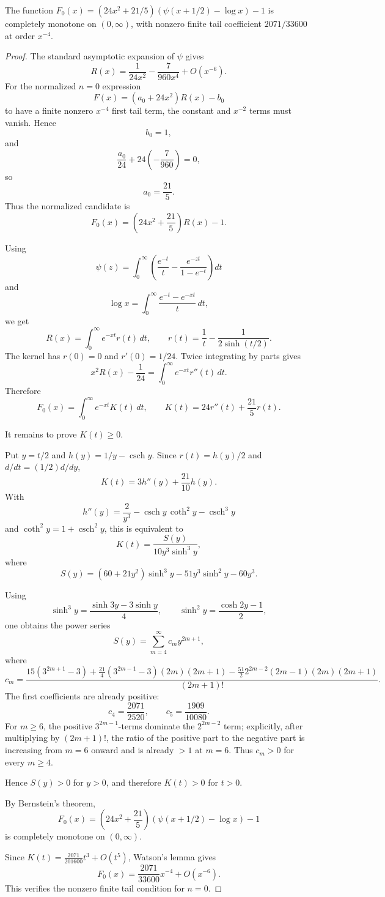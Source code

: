 \begin{proposition}
\label{res:yang-detemple-r-n0-cm-certificate}
The function \(F_0(x)=\left(24x^2+21/5\right)(\psi(x+1/2)-\log x)-1\) is completely monotone on \((0,\infty)\), with nonzero finite tail coefficient \(2071/33600\) at order \(x^{-4}\).
\end{proposition}
\begin{proof}
The standard asymptotic expansion of \(\psi\) gives
\[
R(x)=\frac{1}{24x^2}-\frac{7}{960x^4}+O(x^{-6}).
\]
For the normalized \(n=0\) expression
\[
F(x)=(a_0+24x^2)R(x)-b_0
\]
to have a finite nonzero \(x^{-4}\) first tail term, the constant and \(x^{-2}\) terms must vanish.  Hence
\[
b_0=1,
\]
and
\[
\frac{a_0}{24}+24\left(-\frac{7}{960}\right)=0,
\]
so
\[
a_0=\frac{21}{5}.
\]
Thus the normalized candidate is
\[
F_0(x)=\left(24x^2+\frac{21}{5}\right)R(x)-1.
\]

Using
\[
\psi(z)=\int_0^\infty\left(\frac{e^{-t}}{t}-\frac{e^{-zt}}{1-e^{-t}}\right)dt
\]
and
\[
\log x=\int_0^\infty\frac{e^{-t}-e^{-xt}}{t}\,dt,
\]
we get
\[
R(x)=\int_0^\infty e^{-xt}r(t)\,dt,
\qquad
r(t)=\frac1t-\frac{1}{2\sinh(t/2)}.
\]
The kernel has \(r(0)=0\) and \(r'(0)=1/24\).  Twice integrating by parts gives
\[
x^2R(x)-\frac1{24}=\int_0^\infty e^{-xt}r''(t)\,dt.
\]
Therefore
\[
F_0(x)=\int_0^\infty e^{-xt}K(t)\,dt,
\qquad
K(t)=24r''(t)+\frac{21}{5}r(t).
\]

It remains to prove \(K(t)\ge0\).

Put \(y=t/2\) and \(h(y)=1/y-\operatorname{csch}y\).  Since \(r(t)=h(y)/2\) and \(d/dt=(1/2)d/dy\),
\[
K(t)=3h''(y)+\frac{21}{10}h(y).
\]
With
\[
h''(y)=\frac{2}{y^3}-\operatorname{csch}y\,\coth^2y-\operatorname{csch}^3y
\]
and \(\coth^2y=1+\operatorname{csch}^2y\), this is equivalent to
\[
K(t)=
\frac{
S(y)
}{
10y^3\sinh^3y
},
\]
where
\[
S(y)=(60+21y^2)\sinh^3y-51y^3\sinh^2y-60y^3.
\]

Using
\[
\sinh^3y=\frac{\sinh3y-3\sinh y}{4},
\qquad
\sinh^2y=\frac{\cosh2y-1}{2},
\]
one obtains the power series
\[
S(y)=\sum_{m=4}^{\infty} c_my^{2m+1},
\]
where
\[
c_m=
\frac{
15(3^{2m+1}-3)
+\frac{21}{4}(3^{2m-1}-3)(2m)(2m+1)
-\frac{51}{2}2^{2m-2}(2m-1)(2m)(2m+1)
}{
(2m+1)!}.
\]
The first coefficients are already positive:
\[
c_4=\frac{2071}{2520},\qquad
c_5=\frac{1909}{10080}.
\]
For \(m\ge6\), the positive \(3^{2m-1}\)-terms dominate the \(2^{2m-2}\) term; explicitly, after multiplying by \((2m+1)!\), the ratio of the positive part to the negative part is increasing from \(m=6\) onward and is already \(>1\) at \(m=6\).  Thus \(c_m>0\) for every \(m\ge4\).

Hence \(S(y)>0\) for \(y>0\), and therefore \(K(t)>0\) for \(t>0\).

By Bernstein's theorem,
\[
F_0(x)=\left(24x^2+\frac{21}{5}\right)(\psi(x+1/2)-\log x)-1
\]
is completely monotone on \((0,\infty)\).

Since \(K(t)=\frac{2071}{201600}t^3+O(t^5)\), Watson's lemma gives
\[
F_0(x)=\frac{2071}{33600}x^{-4}+O(x^{-6}).
\]
This verifies the nonzero finite tail condition for \(n=0\).
\end{proof}

